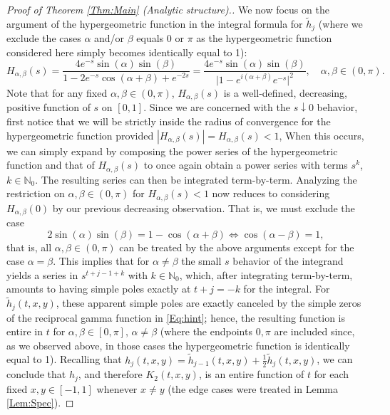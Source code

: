 \documentclass[letterpaper,10pt]{amsart}
\numberwithin{equation}{section}
\begin{document}
\begin{proof}[Proof of Theorem \ref{Thm:Main} (Analytic structure).]
We now focus on the argument of the hypergeometric function in the integral formula for $\widetilde{h}_j$ (where we exclude the cases $\alpha$ and/or $\beta$ equals $0$ or $\pi$ as the hypergeometric function considered here simply becomes identically equal to 1):
\begin{equation}\label{Eq:Halpha}
H_{\alpha,\beta}(s)=\frac{4e^{-s}\sin(\alpha) \sin(\beta)}{1-2e^{-s}\cos(\alpha+\beta)+e^{-2s}}=\frac{4e^{-s}\sin(\alpha) \sin(\beta)}{\big|1-e^{i(\alpha+\beta)}e^{-s}\big|^2},\quad \alpha,\beta\in(0,\pi).
\end{equation}
Note that for any fixed $\alpha,\beta\in(0,\pi)$, $H_{\alpha,\beta}(s)$ is a well-defined, decreasing, positive function of $s$ on $[0,1]$.
Since we are concerned with the $s\downarrow0$ behavior, first notice that we will be strictly inside the radius of convergence for the hypergeometric function provided $|H_{\alpha,\beta}(s)|=H_{\alpha,\beta}(s)<1$, When this occurs, we can simply expand by composing the power series of the hypergeometric function and that of $H_{\alpha,\beta}(s)$ to once again obtain a power series with terms $s^{k}$, $k\in\mathbb{N}_0$. The resulting series can then be integrated term-by-term.
Analyzing the restriction on $\alpha,\beta\in(0,\pi)$ for $H_{\alpha,\beta}(s)<1$ now reduces to considering $H_{\alpha,\beta}(0)$ by our previous decreasing observation. That is, we must exclude the case
\begin{equation}
2\sin(\alpha)\sin(\beta)= 1-\cos(\alpha+\beta) \Leftrightarrow \cos(\alpha-\beta)=1,
\end{equation}
that is, all $\alpha,\beta\in(0,\pi)$ can be treated by the above arguments except for the case $\alpha=\beta$. 
This implies that for $\alpha\neq\beta$ the small $s$ behavior of the integrand yields a series in $s^{t+j-1+k}$ with $k\in\mathbb{N}_0$, which, after integrating term-by-term, amounts to having simple poles exactly at $t+j=-k$ for the integral. For $\widetilde{h}_j(t,x,y)$, these apparent simple poles are exactly canceled by the simple zeros of the reciprocal gamma function in \eqref{Eq:hint}; hence, the resulting function is entire in $t$ for $\alpha,\beta\in[0,\pi]$, $\alpha\neq\beta$ (where the endpoints $0,\pi$ are included since, as we observed above, in those cases the hypergeometric function is identically equal to 1). Recalling that $h_j(t,x,y)=\widetilde{h}_{j-1}(t,x,y)+\tfrac{1}{2}\widetilde{h}_j(t,x,y)$, we can conclude that $h_j$, and therefore $K_2(t,x,y)$, is an entire function of $t$ for each fixed $x,y\in[-1,1]$ whenever $x\neq y$ (the edge cases were treated in Lemma \ref{Lem:Spec}).


\end{proof}
\end{document}
